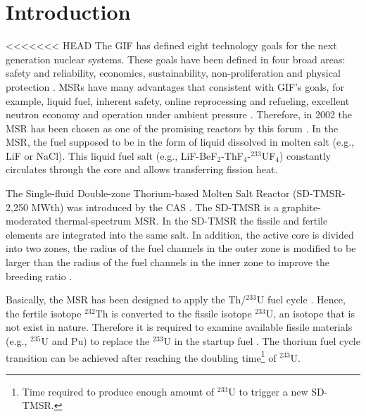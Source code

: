 \section{Introduction}
<<<<<<< HEAD
The \gls{GIF} has defined eight technology goals for the next generation nuclear systems. These goals have been defined in four broad areas: safety and reliability, economics, sustainability, non-proliferation and physical protection \cite{doe2002technology}. \glspl{MSR} have many advantages that consistent with \gls{GIF}'s goals, for example, liquid fuel, inherent safety, online reprocessing and refueling, excellent neutron economy and operation under ambient pressure \cite{siemer2015molten,rosenthal1970molten}. Therefore, in 2002 the \gls{MSR} has been chosen as one of the promising reactors by this forum \cite{doe2002technology,pioro2016handbook}.
In the \gls{MSR}, the fuel supposed to be in the form of liquid dissolved in molten salt (e.g., LiF or NaCl). This liquid fuel salt (e.g., LiF-BeF$_2$-ThF$_4$-$^{233}$UF$_4$) constantly circulates through the core and allows transferring fission heat. 
 
The Single-fluid Double-zone Thorium-based Molten Salt Reactor (SD-TMSR-2,250 MWth) was introduced by the \gls{CAS} \cite{li_optimization_2018}. The SD-TMSR is a graphite-moderated thermal-spectrum MSR. In the SD-TMSR the fissile and fertile elements are integrated into the same salt. In addition, the active core is divided into two zones, the radius of the fuel channels in the outer zone is modified to be larger than the radius of the fuel channels in the inner zone to improve the breeding ratio \cite{nuttin2005potential,li_optimization_2018}.

Basically, the \gls{MSR} has been designed to apply the Th/$^{233}$U fuel cycle \cite{rykhlevskii2019modeling,nuttin2005potential,merle2004scenarios,rosenthal1970molten}. Hence, the fertile isotope $^{232}$Th is converted to the fissile isotope $^{233}$U, an isotope that is not exist in nature. Therefore it is required to examine available fissile materials (e.g., $^{235}$U and Pu) to replace the $^{233}$U in the startup fuel \cite{betzler2016modeling,zou2018transition}. The thorium fuel cycle transition can be achieved after reaching the doubling time\footnote{Time required to produce enough amount of $^{233}$U to trigger a new SD-TMSR.} of $^{233}$U.

